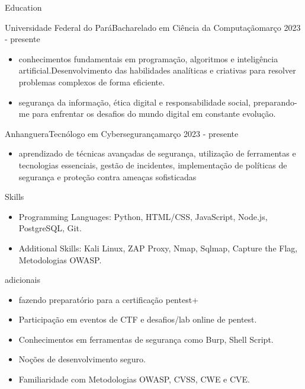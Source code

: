 \documentclass[]{mcdowellcv}
\begin{document}
\begin{cvsection}{Education}
	\begin{cvsubsection}{Universidade Federal do Pará}{Bacharelado em Ciência da Computação}{março 2023 - presente}
		\begin{itemize}
                \vspace{\baselineskip}
			\item conhecimentos fundamentais em programação, algoritmos e inteligência artificial.Desenvolvimento das habilidades analíticas e criativas para resolver problemas complexos de forma eficiente.
                \item segurança da informação, ética digital e responsabilidade social, preparando-me para enfrentar os desafios do mundo digital em constante evolução.
		\end{itemize}
	\end{cvsubsection}
	\begin{cvsubsection}{Anhanguera}{Tecnólogo em Cybersegurança}{março 2023 - presente}
		\begin{itemize}
			\item aprendizado de técnicas avançadas de segurança, utilização de ferramentas e tecnologias essenciais, gestão de incidentes, implementação de políticas de segurança e proteção contra ameaças sofisticadas
		\end{itemize}
	\end{cvsubsection}
\end{cvsection}

\begin{cvsection}{Skills}
	\begin{cvsubsection}{}{}{}
		\begin{itemize}
			\item Programming Languages: Python, HTML/CSS, JavaScript, Node.js, PostgreSQL, Git.
			\item Additional Skills: Kali Linux, ZAP Proxy, Nmap, Sqlmap, Capture the Flag, Metodologias OWASP.
		\end{itemize}
	\end{cvsubsection}
\end{cvsection}
\begin{cvsection}{adicionais}
	\begin{cvsubsection}{}{}{}
		\begin{itemize}
                \item fazendo preparatório para a certificação pentest+
			\item Participação em eventos de CTF e desafios/lab online de pentest.
                \item Conhecimentos em ferramentas de segurança como Burp, Shell Script.
                \item Noções de desenvolvimento seguro.
                \item Familiaridade com Metodologias OWASP, CVSS, CWE e CVE.
		\end{itemize}
	\end{cvsubsection}
\end{cvsection}
\end{document}
